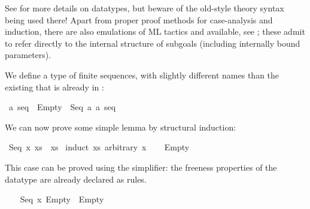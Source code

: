 \begin{isabellebody}
\begin{isamarkuptext}
  See \cite{isabelle-HOL} for more details on datatypes, but beware of
  the old-style theory syntax being used there!  Apart from proper
  proof methods for case-analysis and induction, there are also
  emulations of ML tactics \hyperlink{method.HOL.case-tac}{\mbox{}} and \hyperlink{method.HOL.induct-tac}{\mbox{}} available, see ; these admit
  to refer directly to the internal structure of subgoals (including
  internally bound parameters).%
\end{isamarkuptext}%
\isamarkuptrue%
%
\isamarkuptrue%
%
\begin{isamarkuptext}%
We define a type of finite sequences, with slightly different
  names than the existing  that is already in \hyperlink{theory.Main}{\mbox{}}:%
\end{isamarkuptext}%
\isamarkuptrue%
\isamarkupfalse%
\ {}a\ seq\ {}\ Empty\ {}\ Seq\ {}a\ {}{}a\ seq{}%
\begin{isamarkuptext}%
We can now prove some simple lemma by structural induction:%
\end{isamarkuptext}%
\isamarkuptrue%
\isamarkupfalse%
\ {}Seq\ x\ xs\ {}\ xs{}\isanewline
%
\isadelimproof
%
\endisadelimproof
%
\isatagproof
{}\isamarkupfalse%
\ {}induct\ xs\ arbitrary{}\ x{}\isanewline
\ \ \isamarkupfalse%
\ Empty%
\begin{isamarkuptxt}%
This case can be proved using the simplifier: the freeness
    properties of the datatype are already declared as \hyperlink{attribute.simp}{\mbox{}} rules.%
\end{isamarkuptxt}%
\isamarkuptrue%
\ \ \isamarkupfalse%
\ {}Seq\ x\ Empty\ {}\ Empty{}\isanewline

\end{isabellebody}
